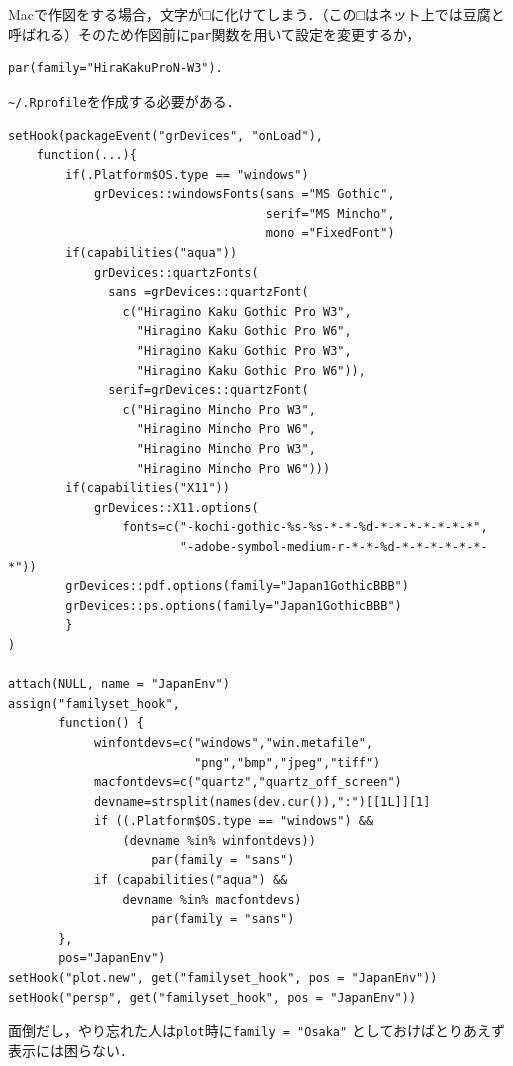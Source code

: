 Macで作図をする場合，文字が□に化けてしまう．（この□はネット上では豆腐と呼ばれる）そのため作図前に{\tt par}関数を用いて設定を変更するか，
\begin{screen}
\begin{verbatim}
par(family="HiraKakuProN-W3").
\end{verbatim}
\end{screen}
\verb+~/.Rprofile+を作成する必要がある．
\begin{screen}
\begin{verbatim}
setHook(packageEvent("grDevices", "onLoad"),
	function(...){
        if(.Platform$OS.type == "windows")
            grDevices::windowsFonts(sans ="MS Gothic",
                                    serif="MS Mincho",
                                    mono ="FixedFont")
        if(capabilities("aqua"))
            grDevices::quartzFonts(
              sans =grDevices::quartzFont(
                c("Hiragino Kaku Gothic Pro W3",
                  "Hiragino Kaku Gothic Pro W6",
                  "Hiragino Kaku Gothic Pro W3",
                  "Hiragino Kaku Gothic Pro W6")),
              serif=grDevices::quartzFont(
                c("Hiragino Mincho Pro W3",
                  "Hiragino Mincho Pro W6",
                  "Hiragino Mincho Pro W3",
                  "Hiragino Mincho Pro W6")))
        if(capabilities("X11"))
            grDevices::X11.options(
                fonts=c("-kochi-gothic-%s-%s-*-*-%d-*-*-*-*-*-*-*",
                        "-adobe-symbol-medium-r-*-*-%d-*-*-*-*-*-*-*"))
        grDevices::pdf.options(family="Japan1GothicBBB")
        grDevices::ps.options(family="Japan1GothicBBB")
        }
)

attach(NULL, name = "JapanEnv")
assign("familyset_hook",
       function() {
            winfontdevs=c("windows","win.metafile",
                          "png","bmp","jpeg","tiff")
            macfontdevs=c("quartz","quartz_off_screen")
            devname=strsplit(names(dev.cur()),":")[[1L]][1]
            if ((.Platform$OS.type == "windows") &&
                (devname %in% winfontdevs))
                    par(family = "sans")
            if (capabilities("aqua") &&
                devname %in% macfontdevs)
                    par(family = "sans")
       },
       pos="JapanEnv")
setHook("plot.new", get("familyset_hook", pos = "JapanEnv"))
setHook("persp", get("familyset_hook", pos = "JapanEnv"))
\end{verbatim}
\end{screen}
面倒だし，やり忘れた人は\verb+plot+時に\verb+family = "Osaka"+ としておけばとりあえず表示には困らない．

